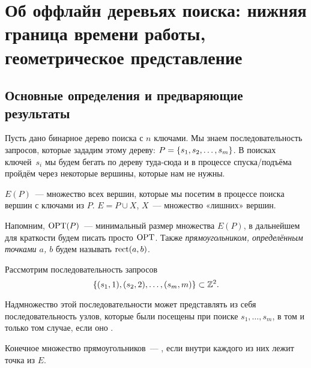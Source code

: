 \section{Об оффлайн деревьях поиска: нижняя граница времени работы, геометрическое представление} 

\subsection{Основные определения и предваряющие результаты}

Пусть дано бинарное дерево поиска с $n$ ключами. Мы знаем последовательность запросов, которые зададим этому дереву: $P = \lbrace s_1,s_2,\ldots,s_m\rbrace$. В поисках ключей~$s_i$ мы будем бегать по дереву туда-сюда и в процессе спуска/подъёма пройдём через некоторые вершины, которые нам не нужны.

\begin{definition}
	$E(P)$~--- множество всех вершин, которые мы посетим в процессе поиска вершин с ключами из $P$. $E = P \cup X$, $X$~--- множество «лишних» вершин.
\end{definition}

Напомним, $\operatorname{OPT} (P)$~--- минимальный размер множества $E(P)$, в дальнейшем для краткости будем писать просто $\operatorname{OPT}$. Также {\it прямоугольником, определённым точками $a$, $b$} будем называть $\operatorname{rect} (a,b)$.


\begin{theorem}
	Рассмотрим последовательность запросов
	\begin{equation*}
		\lbrace(s_1,1),(s_2,2),\ldots,(s_m,m)\rbrace \subset {\mathbb Z}^2.
	\end{equation*}

	Надмножество этой последовательности может представлять из себя последовательность узлов, которые были посещены при поиске $s_1, \ldots, s_m$, в том и только том случае, если оно \arbs.
\end{theorem}

\begin{definition}
	Конечное множество прямоугольников~--- \arbs, если внутри каждого из них лежит точка из $E$.
\end{definition}

